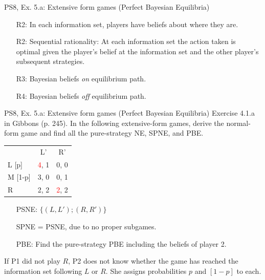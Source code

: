 \begin{frame}{PS8, Ex. 5.a: Extensive form games (Perfect Bayesian Equilibria)}
\begin{multicols}{2}
      \begin{itemize}
        \item[R2:] In each information set, players have beliefs about where they are.
        \item[R2:] Sequential rationality: At each information set the action taken is optimal given the player's belief at the information set and the other player's subsequent strategies.
        \item[R3:] Bayesian beliefs \textit{on} equilibrium path.
        \item[R4:] Bayesian beliefs \textit{off} equilibrium path.
      \end{itemize}
      \vfill\null
    \end{multicols}
\end{frame}
\begin{frame}{PS8, Ex. 5.a: Extensive form games (Perfect Bayesian Equilibria)}
    Exercise 4.1.a in Gibbons (p. 245). In the following extensive-form games, derive the normal-form game and find all the pure-strategy NE, SPNE, and PBE.
    \vspace{-8pt}
    \begin{multicols}{2}
      \begin{table}
        \begin{tabular}{l|c|c|}
          \multicolumn{1}{c}{} & \multicolumn{1}{c}{L'} & \multicolumn{1}{c}{R'} \\\cline{2-3}
          L [p]   & \textcolor{red}{4}, \color{blue}1 & 0, 0 \\\cline{2-3}
          M [1-p] & 3, 0 & 0, \color{blue}1 \\\cline{2-3}
          R       & 2, \color{blue}2 & \textcolor{red}{2}, \color{blue}2 \\\cline{2-3}
        \end{tabular}
      \end{table} \vspace{-4pt}
      \begin{itemize}
        \item[PSNE:] $\{(L,L');(R,R')\}$
        \item[SPNE =] PSNE, due to no proper subgames.
        \item[PBE:] Find the pure-strategy PBE including the beliefs of player 2.
      \end{itemize} \vspace{-4pt}
      If P1 did not play $R$, P2 does not know whether the game has reached the information set following $L$ or $R$. She assigns probabilities $p$ and $[1-p]$ to each.\\\smallskip

\end{multicols}
\end{frame}
